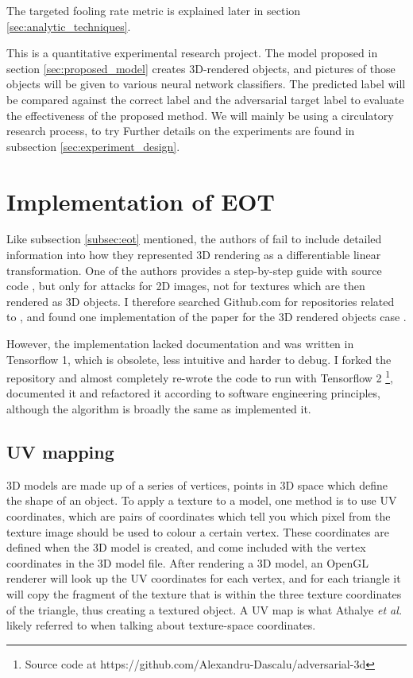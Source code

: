 \bigbreak
The targeted fooling rate metric is explained later in section \ref{sec:analytic_techniques}.

This is a quantitative experimental research project. The model proposed in section \ref{sec:proposed_model} creates 3D-rendered objects, and pictures of those objects will be given to various neural network classifiers. The predicted label will be compared against the correct label and the adversarial target label to evaluate the effectiveness of the proposed method. We will mainly be using a circulatory research process, to try Further details on the experiments are found in subsection \ref{sec:experiment_design}.

\section{Implementation of EOT}
    \label{sec:eot_implementation}

Like subsection \ref{subsec:eot} mentioned, the authors of \cite{athalye} fail to include detailed information into how they represented 3D rendering as a differentiable linear transformation. One of the authors provides a step-by-step guide with source code \cite{athalye_step_by_step}, but only for attacks for 2D images, not for textures which are then rendered as 3D objects. I therefore searched Github.com for repositories related to \cite{athalye}, and found one implementation of the paper for the 3D rendered objects case \cite{ring_adversarial_3d}. 

However, the implementation lacked documentation and was written in Tensorflow 1, which is obsolete, less intuitive and harder to debug. I forked the repository and almost completely re-wrote the code to run with Tensorflow 2 \footnote{Source code at https://github.com/Alexandru-Dascalu/adversarial-3d}, documented it and refactored it according to software engineering principles, although the algorithm is broadly the same as \cite{ring_adversarial_3d} implemented it.

\subsection{UV mapping}

3D models are made up of a series of vertices, points in 3D space which define the shape of an object. To apply a texture to a model, one method is to use UV coordinates, which are pairs of coordinates which tell you which pixel from the texture image should be used to colour a certain vertex. These coordinates are defined when the 3D model is created, and come included with the vertex coordinates in the 3D model file. After rendering a 3D model, an OpenGL renderer will look up the UV coordinates for each vertex, and for each triangle it will copy the fragment of the texture that is within the three texture coordinates of the triangle, thus creating a textured object. A UV map is what Athalye \textit{et al.} \cite{athalye} likely referred to when talking about texture-space coordinates.

